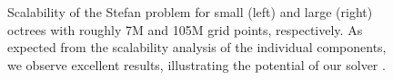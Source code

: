 \begin{figure}
\centering
{}
\caption{Scalability of the Stefan problem for small (left) and large (right) octrees with roughly 7M and 105M grid points, respectively. As expected from the scalability analysis of the individual components, we observe excellent results, illustrating the potential  of our solver .}
\label{fig:stefan_scaling}
\end{figure}

